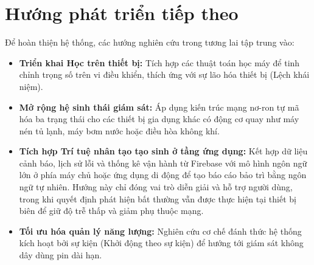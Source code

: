 \section{Hướng phát triển tiếp theo}

Để hoàn thiện hệ thống, các hướng nghiên cứu trong tương lai tập trung vào:

\begin{itemize}
    \item \textbf{Triển khai Học trên thiết bị:} Tích hợp các thuật toán học máy để tinh chỉnh trọng số trên vi điều khiển, thích ứng với sự lão hóa thiết bị (Lệch khái niệm).
    
    \item \textbf{Mở rộng hệ sinh thái giám sát:} Áp dụng kiến trúc mạng nơ-ron tự mã hóa ba trạng thái cho các thiết bị gia dụng khác có động cơ quay như máy nén tủ lạnh, máy bơm nước hoặc điều hòa không khí.
    
    \item \textbf{Tích hợp Trí tuệ nhân tạo tạo sinh ở tầng ứng dụng:} Kết hợp dữ liệu cảnh báo, lịch sử lỗi và thống kê vận hành từ Firebase với mô hình ngôn ngữ lớn ở phía máy chủ hoặc ứng dụng di động để tạo báo cáo bảo trì bằng ngôn ngữ tự nhiên. Hướng này chỉ đóng vai trò diễn giải và hỗ trợ người dùng, trong khi quyết định phát hiện bất thường vẫn được thực hiện tại thiết bị biên để giữ độ trễ thấp và giảm phụ thuộc mạng.
    
    \item \textbf{Tối ưu hóa quản lý năng lượng:} Nghiên cứu cơ chế đánh thức hệ thống kích hoạt bởi sự kiện (Khởi động theo sự kiện) để hướng tới giám sát không dây dùng pin dài hạn.
\end{itemize}
